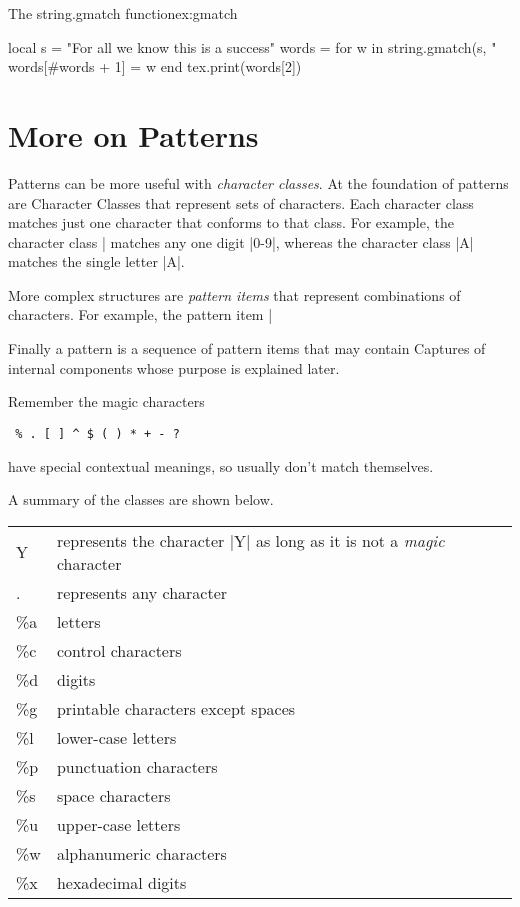 \begin{texexample}{The string.gmatch function}{ex:gmatch}
\begin{luacode}
   local s = "For all we know this is a success"
   words = {}
   for w in string.gmatch(s, "%
      words[#words + 1] = w
   end
   tex.print(words[2])   
\end{luacode}
\end{texexample}

\section{More on Patterns}

Patterns can be more useful with \textit{character classes}. 
At the foundation of patterns are Character Classes that represent sets of characters. Each character class matches just one character that conforms to that class. For example, the character class |%
matches any one digit |0-9|, whereas the character class |A| matches the single letter |A|.

More complex structures are \emph{pattern items} that represent combinations of characters. For example, the pattern item |%

Finally a pattern is a sequence of pattern items that may contain Captures of internal components whose purpose is explained later.

Remember the magic characters
\begin{verbatim}
 % . [ ] ^ $ ( ) * + - ? 
\end{verbatim}
 have special contextual meanings, so usually don't match themselves.
 
A summary of the classes are shown below.  
 
\begin{longtable}{>{\color{blue800}}ll}
Y & represents the character |Y| as long as it is not a \emph{magic} character\\
. & represents any character\\
\%a & letters\\
\%c &control characters\\
\%d &digits\\ 
\%g &printable characters except spaces\\
\%l &lower-case letters\\
\%p &punctuation characters\\
\%s &space characters\\
\%u  &upper-case letters\\
\%w  &alphanumeric characters\\
\%x  &hexadecimal digits\\
\end{longtable}

